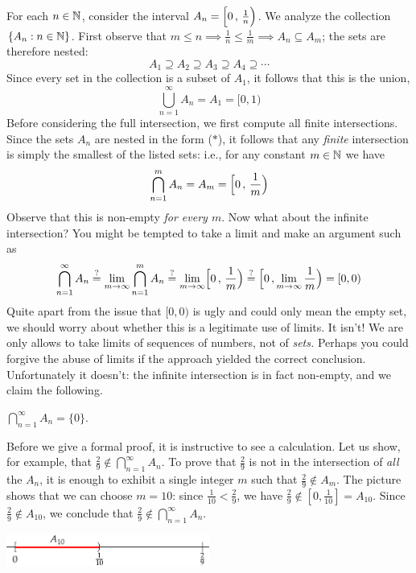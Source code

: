 For each $n\in\mathbb{N}$, consider the interval $A_n=\Bigl[0\,,\,\frac 1n\Bigr)$. We analyze the collection $\{A_n:n\in\mathbb{N}\}$. First observe that $m\le n\implies \frac 1n\le \frac 1m\implies A_n\subseteq A_m$; the sets are therefore nested:
\[
	A_1\supseteq A_2\supseteq A_3\supseteq A_4\supseteq\cdots\tag{$\ast$}
\]
Since every set in the collection is a subset of $A_1$, it follows that this is the union,
\[
	\bigcup_{n=1}^\infty A_n=A_1=[0,1)
\]
Before considering the full intersection, we first compute all finite intersections. Since the sets $A_n$ are nested in the form ($\ast$), it follows that any \emph{finite} intersection is simply the smallest of the listed sets: i.e., for any constant $m\in\mathbb{N}$ we have
\[
	\bigcap_{n=1}^mA_n=A_m=\Bigl[0\,,\,\frac 1m\Bigr)
\]
Observe that this is non-empty \emph{for every $m$}. Now what about the infinite intersection? You might be tempted to take a limit and make an argument such as
\[
	\bigcap\limits_{n=1}^\infty A_n\overset{?}{=}\lim_{m\to\infty}\bigcap_{n=1}^mA_n\overset{?}{=}\lim_{m\to\infty}\Bigl[0\,,\,\frac 1m\Bigr)\overset{?}{=}\Bigl[0\,,\lim_{m\to\infty}\frac 1m\Bigr)=[0,0)
\]
Quite apart from the issue that $[0,0)$ is ugly and could only mean the empty set, we should worry about whether this is a legitimate use of limits. It isn't! We are only allows to take limits of sequences of numbers, not of \emph{sets.} Perhaps you could forgive the abuse of limits if the approach yielded the correct conclusion. Unfortunately it doesn't: the infinite intersection is in fact non-empty, and we claim the following.

\begin{thm}{}{}
	$\bigcap\limits_{n=1}^\infty A_n=\{0\}$.
\end{thm}

Before we give a formal proof, it is instructive to see a calculation. Let us show, for example, that $\frac 29\not\in\bigcap\limits_{n=1}^\infty A_n$. To prove that $\frac 29$ is not in the intersection of \emph{all} the $A_n$, it is enough to exhibit a single integer $m$ such that $\frac 29\not\in A_m$. The picture shows that we can choose $m=10$: since $\frac 1{10}<\frac 29$, we have $\frac 29\not\in [0,\frac 1{10}]=A_{10}$. Since $\frac 29\not\in A_{10}$, we conclude that $\frac 29\not\in\bigcap\limits_{n=1}^\infty A_n$.
\begin{center}
	\includegraphics[width=0.5\textwidth]{setsii-06-intervalex}
\end{center}

